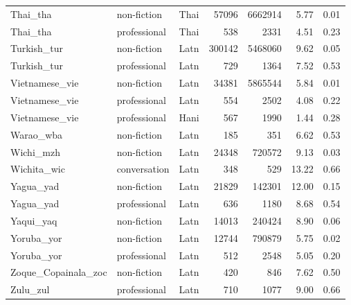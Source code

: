 \begin{longtable}{lllrrrr}
  Thai\_tha & non-fiction & Thai & 57096 & 6662914 & 5.77 & 0.01 \\ 
  Thai\_tha & professional & Thai & 538 & 2331 & 4.51 & 0.23 \\ 
  Turkish\_tur & non-fiction & Latn & 300142 & 5468060 & 9.62 & 0.05 \\ 
  Turkish\_tur & professional & Latn & 729 & 1364 & 7.52 & 0.53 \\ 
  Vietnamese\_vie & non-fiction & Latn & 34381 & 5865544 & 5.84 & 0.01 \\ 
  Vietnamese\_vie & professional & Latn & 554 & 2502 & 4.08 & 0.22 \\ 
  Vietnamese\_vie & professional & Hani & 567 & 1990 & 1.44 & 0.28 \\ 
  Warao\_wba & non-fiction & Latn & 185 & 351 & 6.62 & 0.53 \\ 
  Wichi\_mzh & non-fiction & Latn & 24348 & 720572 & 9.13 & 0.03 \\ 
  Wichita\_wic & conversation & Latn & 348 & 529 & 13.22 & 0.66 \\ 
  Yagua\_yad & non-fiction & Latn & 21829 & 142301 & 12.00 & 0.15 \\ 
  Yagua\_yad & professional & Latn & 636 & 1180 & 8.68 & 0.54 \\ 
  Yaqui\_yaq & non-fiction & Latn & 14013 & 240424 & 8.90 & 0.06 \\ 
  Yoruba\_yor & non-fiction & Latn & 12744 & 790879 & 5.75 & 0.02 \\ 
  Yoruba\_yor & professional & Latn & 512 & 2548 & 5.05 & 0.20 \\ 
  Zoque\_Copainala\_zoc & non-fiction & Latn & 420 & 846 & 7.62 & 0.50 \\ 
  Zulu\_zul & professional & Latn & 710 & 1077 & 9.00 & 0.66 \\ 
  \hline
\end{longtable}
